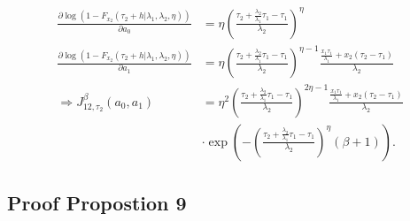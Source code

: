 \documentclass{article}
\begin{document}
\begin{align*}
\frac{\partial \log\left(1-F_{x_2}(\tau_2+h|\lambda_1,\lambda_2,\eta)\right)}{\partial a_0}&=\eta\left(\frac{\tau_2+\frac{\lambda_2}{\lambda_1}\tau_1-\tau_1}{\lambda_2}\right)^{\eta}
\\
\frac{\partial \log\left(1-F_{x_2}(\tau_2+h|\lambda_1,\lambda_2,\eta)\right)}{\partial a_1}&=\eta\left(\frac{\tau_2+\frac{\lambda_2}{\lambda_1}\tau_1-\tau_1}{\lambda_2}\right)^{\eta-1}\frac{\frac{x_1\tau_1}{\lambda_1}+x_2(\tau_2-\tau_1)}{\lambda_2}
\\
\Rightarrow  J_{12,\tau_2}^{\beta}(a_0,a_1)&=\eta^2\left(\frac{\tau_2+\frac{\lambda_2}{\lambda_1}\tau_1-\tau_1}{\lambda_2}\right)^{2\eta-1}\frac{\frac{x_1\tau_1}{\lambda_1}+x_2(\tau_2-\tau_1)}{\lambda_2}
\\
&\cdot\exp\left(-\left(\frac{\tau_2+\frac{\lambda_2}{\lambda_1}\tau_1-\tau_1}{\lambda_2}\right)^{\eta}(\beta+1)\right).
\end{align*}

\subsection{Proof Propostion 9}
\end{document}
